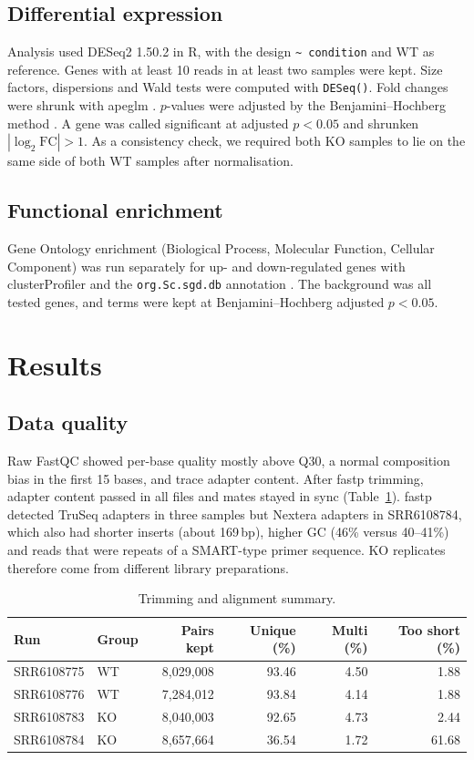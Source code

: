 \documentclass[11pt, a4paper]{article}
\begin{document}
\subsection{Differential expression}
Analysis used DESeq2 1.50.2 \cite{love2014} in R, with the design \texttt{\textasciitilde\,condition} and WT as reference. Genes with at least 10 reads in at least two samples were kept. Size factors, dispersions and Wald tests were computed with \texttt{DESeq()}. Fold changes were shrunk with apeglm \cite{zhu2019}. $p$-values were adjusted by the Benjamini--Hochberg method \cite{benjamini1995}. A gene was called significant at adjusted $p<0.05$ and shrunken $|\log_2\mathrm{FC}|>1$. As a consistency check, we required both KO samples to lie on the same side of both WT samples after normalisation.

\subsection{Functional enrichment}
Gene Ontology \cite{ashburner2000} enrichment (Biological Process, Molecular Function, Cellular Component) was run separately for up- and down-regulated genes with clusterProfiler \cite{wu2021} and the \texttt{org.Sc.sgd.db} annotation \cite{cherry2012}. The background was all tested genes, and terms were kept at Benjamini--Hochberg adjusted $p<0.05$.

\section{Results}

\subsection{Data quality}
Raw FastQC showed per-base quality mostly above Q30, a normal composition bias in the first 15 bases, and trace adapter content. After fastp trimming, adapter content passed in all files and mates stayed in sync (Table~\ref{tab:trim}). fastp detected TruSeq adapters in three samples but Nextera adapters in SRR6108784, which also had shorter inserts (about 169\,bp), higher GC (46\% versus 40--41\%) and reads that were repeats of a SMART-type primer sequence. KO replicates therefore come from different library preparations.

\begin{table}[ht]
\centering
\caption{Trimming and alignment summary.}
\label{tab:trim}
\begin{tabular}{llrrrr}
\toprule
Run & Group & Pairs kept & Unique (\%) & Multi (\%) & Too short (\%) \\
\midrule
SRR6108775 & WT & 8,029,008 & 93.46 & 4.50 & 1.88 \\
SRR6108776 & WT & 7,284,012 & 93.84 & 4.14 & 1.88 \\
SRR6108783 & KO & 8,040,003 & 92.65 & 4.73 & 2.44 \\
SRR6108784 & KO & 8,657,664 & 36.54 & 1.72 & 61.68 \\
\bottomrule
\end{tabular}
\end{table}
\end{document}
